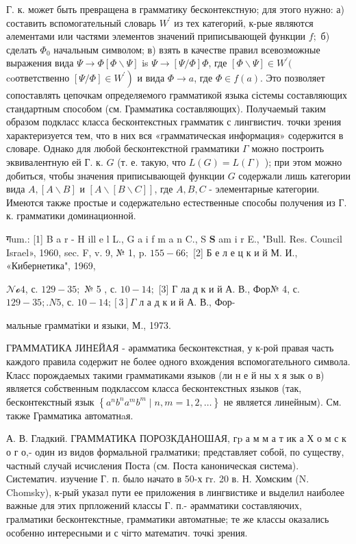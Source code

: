 \documentclass[10pt]{article}
\begin{document}
Г. к. может быть превращена в грамматику бесконтекстную; для этого нужно: а) составить вспомогательный словарь $W^{\prime}$ из тех категорий, к-рые являются әлементами или частями элементов значений приписывающей функции $f ;$ б) сделать $\Phi_{0}$ начальным символом; в) взять в качестве правил всевозможные выражения вида $\Psi \rightarrow \Phi[\Phi \backslash \Psi]$ is $\Psi \rightarrow[\Psi / \Phi] \Phi$, где $[\Phi \backslash \Psi] \in W^{\prime}($ coответственно $\left.[\Psi / \Phi] \in W^{\prime}\right)$ и вида $\Phi \rightarrow a$, где $\Phi \in f(a)$. Это позволяет сопоставлять цепочкам определяемого грамматикой языка сістемы составляющих стандартным способом (см. Грамматика составляющих). Получаемый таким образом подкласс класса бесконтекстных грамматик с лингвистич. точки зрения характеризуется тем, что в них вся «грамматическая информация» содержится в словаре. Однако для любой бесконтекстной грамматики $\Gamma$ можно построить эквивалентную ей Г. к. $G$ (т. е. такую, что $L(G)=L(\Gamma)$ ); при этом можно добиться, чтобы значения приписывающей функции $G$ содержали лишь категории вида $A,[A \backslash B]$ и $[A \backslash[B \backslash C]]$, где $A, B, C$ - элементарные категории. Имеются также простые и содержательно естественные способы получения из Г. к. грамматики доминационной.



गum.: [1] B a r - H ill e l L., G a i f m a n C., S $\mathbf{S}$ am i r E., "Bull. Res. Council Israel», 1960, sec. F, v. 9, № 1, p. $155-66 ;$ [2] Б е л е ц к и й М. И., «Кибернетика", 1969,

$\mathcal{N o} 4$, с. $129-35 ;$ № 5 , с. $10-14 ;$ [3] Г ла д к и й А. В., Фор№ 4, с. $129-35 ; . N 5$, с. $10-14 ;[3] \Gamma$ л а д к и й А. В., Фор-

мальные грамматіки и языки, М., 1973.



ГРАММАТИКА ЈИНЕЙАЯ - әрамматика бесконтекстная, у к-рой правая часть каждого правила содержит не более одного вхождения вспомогательного символа. Класс порождаемых такими грамматиками языков (ли н е й ны х я зык о в) является собственным подклассом класса бесконтекстных языков (так, бесконтекстный язык $\left\{a^{n} b^{n} a^{m} b^{m} \mid n, m=1,2, \ldots\right\}$ не является линейным). См. также Грамматика автоматнaя.



А. В. Гладкий. ГРАММАТИКА ПОРОЗКДАНОШАЯ, $г \mathrm{p}$ а м м а т ик а Х о м с к о г о,- один из видов формальной гралматики; представляет собой, по существу, частный случай исчисления Поста (см. Поста каноническая система). Систематич. изучение Г. п. было начато в 50-х гr. 20 в. Н. Хомским (N. Chomsky), к-рый указал пути ее приложения в лингвистике и выделил наиболее важные для этих прпложений классы Г. п.- әрамматики составляючих, гралматики бесконтекстные, грамматики автоматные; те же классы оказались особенно интересными и с чігто математич. точкі зрения.
\end{document}
